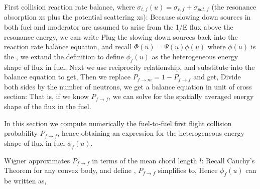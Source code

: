 \documentclass{school-22.211-notes}
\begin{document}
First collision reaction rate balance, where $\sigma_{t,f}(u) = \sigma_{r,f} + \sigma_{pot, f}$ (the resonance absorption xs plus the potential scattering xs):
Because slowing down sources in both fuel and moderator are assumed to arise from the 1/E flux above the resonance energy, we can write
Plug the slowing down sources back into the reaction rate balance equation, and recall $\Phi(u) = \Psi(u) \phi(u)$ where $\phi(u)$ is the , we extand the definition to define $\phi_f(u)$ as the heterogeneous energy shape of flux in fuel,
Next we use reciprocity relationship,
and substitute into the balance equation to get,
Then we replace $P_{f\to m} = 1 - P_{f\to f}$ and get, 
Divide both sides by the number of neutrons, we get a balance equation in unit of cross section:
That is, if we know $P_{f\to f}$, we can solve for the spatially averaged energy shape of the flux in the fuel. 

In this section we compute numerically the fuel-to-fuel first flight collision probability $P_{f\to f}$, hence obtaining an expression for the heterogeneous energy shape of flux in fuel $\phi_f(u)$. 

Wigner approximates $P_{f\to f}$ in terms of the mean chord length $l$: 
Recall Cauchy's Theorem for any convex body, 
and define ,
$P_{f\to f}$ simplifies to, 
Hence $\phi_f(u)$ can be written as, 
\end{document}
